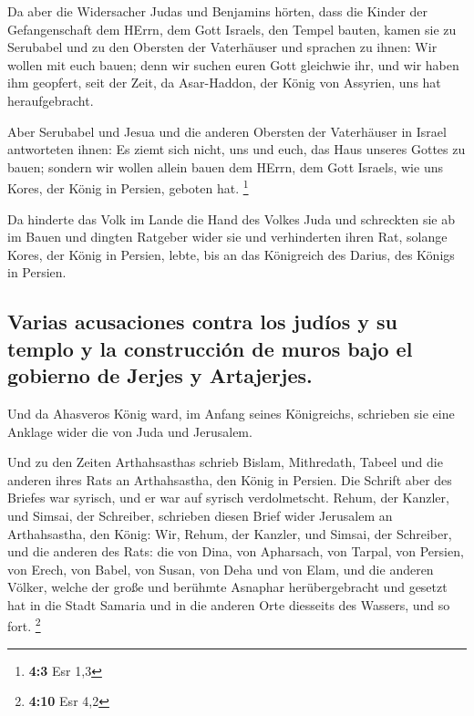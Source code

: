 Da aber die Widersacher Judas und Benjamins hörten, dass
die Kinder der Gefangenschaft dem HErrn, dem Gott Israels, den Tempel
bauten,  kamen sie zu Serubabel und zu den Obersten der
Vaterhäuser und sprachen zu ihnen: Wir wollen mit euch bauen; denn wir
suchen euren Gott gleichwie ihr, und wir haben ihm geopfert, seit der
Zeit, da Asar-Haddon, der König von Assyrien, uns hat heraufgebracht.

 Aber Serubabel und Jesua und die anderen Obersten der
Vaterhäuser in Israel antworteten ihnen: Es ziemt sich nicht, uns und
euch, das Haus unseres Gottes zu bauen; sondern wir wollen allein bauen
dem HErrn, dem Gott Israels, wie uns Kores, der König in Persien,
geboten hat. \footnote{\textbf{4:3} Esr 1,3}

 Da hinderte das Volk im Lande die Hand des Volkes Juda
und schreckten sie ab im Bauen  und dingten Ratgeber wider
sie und verhinderten ihren Rat, solange Kores, der König in Persien,
lebte, bis an das Königreich des Darius, des Königs in Persien.

\hypertarget{varias-acusaciones-contra-los-juduxedos-y-su-templo-y-la-construcciuxf3n-de-muros-bajo-el-gobierno-de-jerjes-y-artajerjes.}{%
\subsection{Varias acusaciones contra los judíos y su templo y la
construcción de muros bajo el gobierno de Jerjes y
Artajerjes.}\label{varias-acusaciones-contra-los-juduxedos-y-su-templo-y-la-construcciuxf3n-de-muros-bajo-el-gobierno-de-jerjes-y-artajerjes.}}

 Und da Ahasveros König ward, im Anfang seines
Königreichs, schrieben sie eine Anklage wider die von Juda und
Jerusalem.

 Und zu den Zeiten Arthahsasthas schrieb Bislam,
Mithredath, Tabeel und die anderen ihres Rats an Arthahsastha, den König
in Persien. Die Schrift aber des Briefes war syrisch, und er war auf
syrisch verdolmetscht.  Rehum, der Kanzler, und Simsai,
der Schreiber, schrieben diesen Brief wider Jerusalem an Arthahsastha,
den König:  Wir, Rehum, der Kanzler, und Simsai, der
Schreiber, und die anderen des Rats: die von Dina, von Apharsach, von
Tarpal, von Persien, von Erech, von Babel, von Susan, von Deha und von
Elam,  und die anderen Völker, welche der große und
berühmte Asnaphar herübergebracht und gesetzt hat in die Stadt Samaria
und in die anderen Orte diesseits des Wassers, und so fort. \footnote{\textbf{4:10}
  Esr 4,2}

